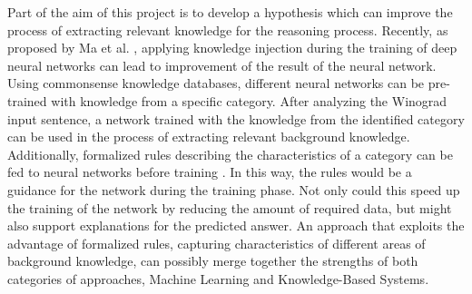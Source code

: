  Part of the aim of this project is to develop a hypothesis which can improve the process of extracting relevant knowledge for the reasoning process. Recently, as proposed by Ma et al. \cite{DBLP:conf/aaai/MaPC18}, applying knowledge injection during the training of deep neural networks can lead to improvement of the result of the neural network. Using commonsense knowledge databases, different neural networks can be pre-trained with knowledge from a specific category. After analyzing the Winograd input sentence, a network trained with the knowledge from the identified category can be used in the process of extracting relevant background knowledge. 
Additionally, formalized rules describing the characteristics of a category can be fed to neural networks before training \cite{DBLP:conf/aaai/RoychowdhuryDG18}. In this way, the rules would be a guidance for the network during the training phase. Not only could this speed up the training of the network by reducing the amount of required data, but might also support explanations for the predicted answer. An approach that exploits the advantage of formalized rules, capturing characteristics of different areas of background knowledge, can possibly merge together the strengths of both categories of approaches, Machine Learning and Knowledge-Based Systems. 
